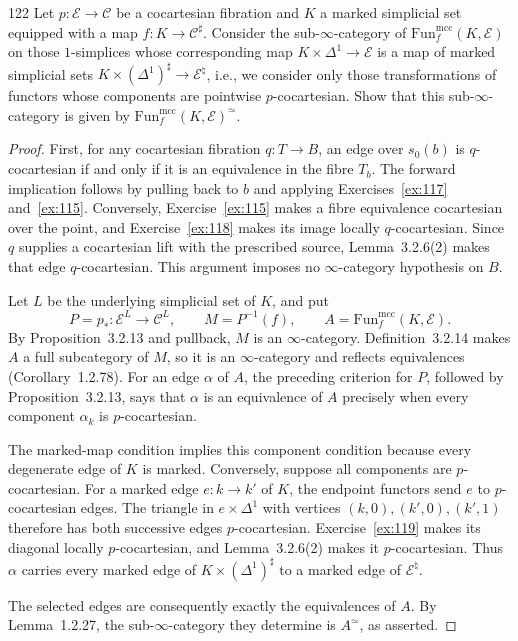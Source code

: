 \begin{exercise}{122}
Let $p\colon\mathcal E\to\mathcal C$ be a cocartesian fibration and $K$ a marked simplicial set
equipped with a map $f\colon K\to\mathcal C^{\sharp}$. Consider the sub-$\infty$-category of $\mathrm{Fun}^{\mathrm{mcc}}_f(K,\mathcal E)$ on those
$1$-simplices whose corresponding map $K\times\Delta^1\to\mathcal E$ is a map of marked simplicial sets
$K\times(\Delta^1)^{\sharp}\to\mathcal E^{\natural}$, i.e., we consider only those transformations of functors whose components
are pointwise $p$-cocartesian. Show that this sub-$\infty$-category is given by $\mathrm{Fun}^{\mathrm{mcc}}_f(K,\mathcal E)^{\simeq}$.

\begin{proof}
First, for any cocartesian fibration $q\colon T\to B$, an edge over
$s_0(b)$ is $q$-cocartesian if and only if it is an equivalence in the fibre $T_b$.
The forward implication follows by pulling back to $b$ and applying
Exercises~\ref{ex:117} and~\ref{ex:115}.
Conversely, Exercise~\ref{ex:115} makes a fibre equivalence cocartesian over the point,
and Exercise~\ref{ex:118} makes its image locally $q$-cocartesian.
Since $q$ supplies a cocartesian lift with the prescribed source,
Lemma~3.2.6(2) makes that edge $q$-cocartesian.
This argument imposes no $\infty$-category hypothesis on $B$.

Let $L$ be the underlying simplicial set of $K$, and put
\[
 P=p_*\colon\mathcal E^L\to\mathcal C^L,
 \qquad M=P^{-1}(f),\qquad A=\mathrm{Fun}^{\mathrm{mcc}}_f(K,\mathcal E).
\]
By Proposition~3.2.13 and pullback, $M$ is an $\infty$-category.
Definition~3.2.14 makes $A$ a full subcategory of $M$, so it is an
$\infty$-category and reflects equivalences (Corollary~1.2.78).
For an edge $\alpha$ of $A$, the preceding criterion for $P$, followed by
Proposition~3.2.13, says that $\alpha$ is an equivalence of $A$ precisely
when every component $\alpha_k$ is $p$-cocartesian.

The marked-map condition implies this component condition because every
degenerate edge of $K$ is marked.
Conversely, suppose all components are $p$-cocartesian.
For a marked edge $e\colon k\to k'$ of $K$, the endpoint functors send $e$
to $p$-cocartesian edges.
The triangle in $e\times\Delta^1$ with vertices
$(k,0),(k',0),(k',1)$ therefore has both successive edges $p$-cocartesian.
Exercise~\ref{ex:119} makes its diagonal locally $p$-cocartesian,
and Lemma~3.2.6(2) makes it $p$-cocartesian.
Thus $\alpha$ carries every marked edge of $K\times(\Delta^1)^{\sharp}$
to a marked edge of $\mathcal E^{\natural}$.

The selected edges are consequently exactly the equivalences of $A$.
By Lemma~1.2.27, the sub-$\infty$-category they determine is $A^{\simeq}$,
as asserted.
\end{proof}
\end{exercise}
